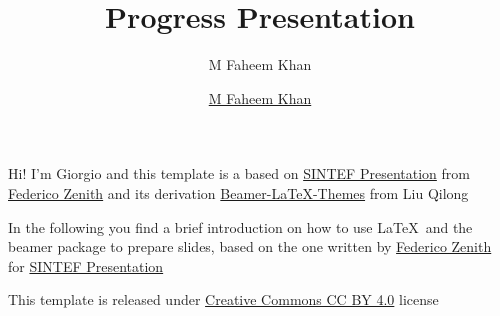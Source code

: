 \documentclass{beamer}
\title{Progress Presentation}
\subtitle{M Faheem Khan}
\author{\href{mailto:ciao@gio.im}{M Faheem Khan}}
\newcommand{\hrefcol}[2]{\textcolor{cyan}{\href{#1}{#2}}}
\begin{document}
\maketitle

\begin{frame}

Hi! I'm Giorgio and this template is a based on \hrefcol{https://www.overleaf.com/latex/templates/sintef-presentation/jhbhdffczpnx}{SINTEF Presentation} from \hrefcol{mailto:federico.zenith@sintef.no}{Federico Zenith} and its derivation \hrefcol{https://github.com/TOB-KNPOB/Beamer-LaTeX-Themes}{Beamer-LaTeX-Themes} from Liu Qilong

\vspace{\baselineskip}

In the following you find a brief introduction on how to use \LaTeX\ and the beamer package to prepare slides, based on the one written by \hrefcol{mailto:federico.zenith@sintef.no}{Federico Zenith} for \hrefcol{https://www.overleaf.com/latex/templates/sintef-presentation/jhbhdffczpnx}{SINTEF Presentation}

This template is released under \hrefcol{https://creativecommons.org/licenses/by-nc/4.0/legalcode}{Creative Commons CC BY 4.0} license

\end{frame}


% 

% 

% 

% 


\backmatter
\end{document}
